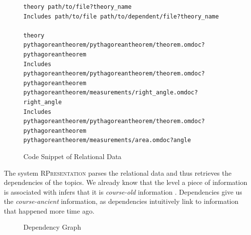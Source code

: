 \documentclass[twoside, 12pt]{article}
\newcommand{\sys}{\textsc{RPresentation}\xspace}
\begin{document}
\begin{figure}
\vspace{-26pt}
\begin{verbatim}
theory path/to/file?theory_name
Includes path/to/file path/to/dependent/file?theory_name

theory 
pythagoreantheorem/pythagoreantheorem/theorem.omdoc?pythagoreantheorem
Includes 
pythagoreantheorem/pythagoreantheorem/theorem.omdoc?pythagoreantheorem
pythagoreantheorem/measurements/right_angle.omdoc?right_angle
Includes 
pythagoreantheorem/pythagoreantheorem/theorem.omdoc?pythagoreantheorem
pythagoreantheorem/measurements/area.omdoc?angle
\end{verbatim}
\vspace{-5pt}
  \caption[Caption for LOF]{Code Snippet of Relational Data \footnotemark}
  \label{fig:reldatacode}
  \vspace{12pt}
\end{figure}

\begin{figure}
\vspace{-50pt}
\end{figure}


The system \sys parses the relational data and thus retrieves the dependencies of the topics. We already know that the level a piece of information is associated with infers that it is \textit{course-old} information . Dependencies give us the \textit{course-ancient} information, as dependencies intuitively link to information that happened more time ago.\\

\begin{figure}
\vspace{-26pt}
  \begin{center}
\vspace{-5pt}
  \caption{Dependency Graph}
  \label{fig:depGraphPythagoreanFull}
\vspace{12pt}
  \end{center}
\end{figure}
\end{document}
